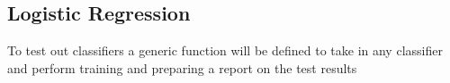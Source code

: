 \documentclass[11pt]{article}
\begin{document}
    \begin{center}
    \end{center}
    { \hspace*{\fill} \\}
    
    \begin{center}
    \end{center}
    { \hspace*{\fill} \\}
    
    \begin{center}
    \end{center}
    { \hspace*{\fill} \\}
    
    \hypertarget{logistic-regression}{%
\subsection{Logistic Regression}\label{logistic-regression}}

To test out classifiers a generic function will be defined to take in
any classifier and perform training and preparing a report on the test
results
\end{document}
